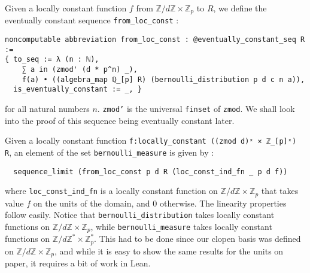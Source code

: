 \documentclass[a4paper,UKenglish,cleveref, autoref, thm-restate]{lipics-v2021}
\newcommand{\lean}[1]{\texttt{#1}\xspace} %
\begin{document}
Given a locally constant function $f$ from $\mathbb{Z}/d \mathbb{Z} \times \mathbb{Z}_p$ to $R$, 
we define the eventually constant sequence \lean{from\_loc\_const} : 
\begin{lstlisting}
noncomputable abbreviation from_loc_const : @eventually_constant_seq R :=
{ to_seq := λ (n : ℕ), 
    ∑ a in (zmod' (d * p^n) _), 
    f(a) • ((algebra_map ℚ_[p] R) (bernoulli_distribution p d c n a)),
  is_eventually_constant := _, }
\end{lstlisting} 
for all natural numbers $n$. \lean{zmod'} is the universal \lean{finset} of \lean{zmod}. 
We shall look into the proof of this sequence being eventually constant later. 

Given a locally constant function \lean{f:locally\_constant ((zmod d)ˣ × ℤ\_[p]ˣ) R}, 
an element of the set \lean{bernoulli\_measure} is given by : 
\begin{lstlisting}
  sequence_limit (from_loc_const p d R (loc_const_ind_fn _ p d f))
\end{lstlisting}
where \lean{loc\_const\_ind\_fn} is a locally constant function on $\mathbb{Z}/d \mathbb{Z} \times \mathbb{Z}_p$ 
that takes value $f$ on the units of the domain, and 0 otherwise. The linearity properties follow easily. Notice that \lean{bernoulli\_distribution} takes locally constant functions on $\mathbb{Z}/d \mathbb{Z} \times \mathbb{Z}_p$, 
while \lean{bernoulli\_measure} takes locally constant functions on $\mathbb{Z}/d \mathbb{Z}^* \times \mathbb{Z}_p^*$. This had to be done since our clopen basis was defined on 
$\mathbb{Z}/d \mathbb{Z} \times \mathbb{Z}_p$, and while it is easy to show the same results for the units on paper, it requires a bit of work in Lean.
\end{document}
